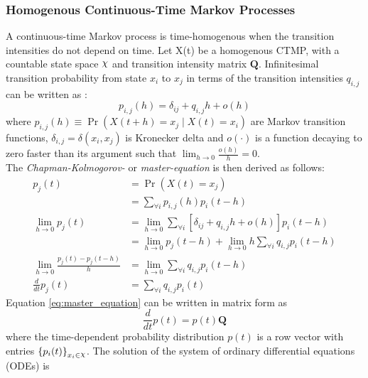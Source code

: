 \subsubsection{Homogenous Continuous-Time Markov Processes}
A continuous-time Markov process is time-homogenous when the transition intensities do not depend on time. Let X(t) be a homogenous CTMP, with a countable state space $ \rchi $ and transition intensity matrix $ \textbf{Q} $. Infinitesimal transition probability from state $ x_{i} $ to $ x_{j} $ in terms of the transition intensities $ q_{i,j} $ can be written as \cite{Cohn2010a}:
\begin{equation}
p_{i,j}(h)=\delta_{ij}+q_{i,j} h+o(h)
\label{eq:Markov_trans_func}
\end{equation}
where $ p_{i, j}(h) \equiv \operatorname{Pr}(X(t+h)=x_j\mid X(t)=x_i) $ are Markov transition functions, $ \delta_{i,j} = \delta(x_i,x_j)$ is Kronecker delta and $ o(\cdot) $ is a function decaying to zero faster than its argument such that $ \lim_{h \to 0} \frac{o(h)}{h} = 0 $.\\
The \textit{Chapman-Kolmogorov-} or \textit{master-equation} is then derived as follows:
\begin{align}
p_{j}(t) &= \operatorname{Pr}(X(t) = x_{j}) \nonumber\\
& =\sum_{\forall i} p_{i, j}(h) p_{i}(t-h) \nonumber \\
\lim_{h\rightarrow 0} p_{j}(t) 
& = \lim_{h\rightarrow 0} \sum_{\forall i} \left[ \delta_{ij}+q_{i,j} h+o(h)\right]  p_{i}(t-h) \nonumber \\ 
& = \lim_{h\rightarrow 0} p_{j}(t-h) + \lim_{h\rightarrow 0} h \sum_{\forall i} q_{i,j} p_{i}(t-h) \nonumber \\
\lim_{h\rightarrow 0} \frac{p_{j}(t) - p_{j}(t-h)}{h} 
&= \lim_{h\rightarrow 0} \sum_{\forall i} q_{i,j} p_{i}(t-h) \nonumber\\
\frac{d}{dt} p_{j}(t) & = \sum_{\forall i} q_{i,j} p_{i}(t)
\label{eq:master_equation}
\end{align}
Equation \ref{eq:master_equation} can be written in matrix form as
\begin{equation}
\frac{d}{dt} p(t) = p(t)\textbf{Q}
\end{equation}
where the time-dependent probability distribution $ p(t) $ is a row vector with entries $ \left\lbrace p_{i}(t)\right\rbrace_{x_{i}\in \rchi} $. The solution of the system of ordinary differential equations (ODEs) is
